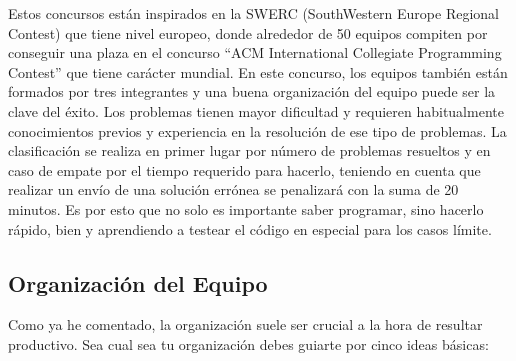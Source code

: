 Estos concursos están inspirados en la SWERC (SouthWestern Europe
Regional Contest) que tiene nivel europeo, donde alrededor de 50
equipos compiten por conseguir una plaza en el concurso ``ACM
International Collegiate Programming Contest'' que tiene carácter
mundial. En este concurso, los equipos también están formados por tres
integrantes y una buena organización del equipo puede ser la clave del
éxito. Los problemas tienen mayor dificultad y requieren habitualmente
conocimientos previos y experiencia en la resolución de ese tipo de
problemas. La clasificación se realiza en primer lugar por número de
problemas resueltos y en caso de empate por el tiempo requerido para
hacerlo, teniendo en cuenta que realizar un envío de una solución
errónea se penalizará con la suma de 20 minutos. Es por esto que no
solo es importante saber programar, sino hacerlo rápido, bien y
aprendiendo a testear el código en especial para los casos límite.

\subsection{Organización del Equipo}
\label{sec:concursos:organizacion}

Como ya he comentado, la organización suele ser crucial a la hora de
resultar productivo. Sea cual sea tu organización debes guiarte por
cinco ideas básicas:


